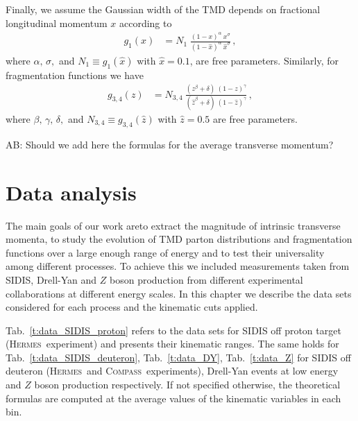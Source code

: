 \documentclass[aps,preprintnumbers,showpacs,nofootinbib,superscriptaddress,floatfix]{revtex4}
\newcommand{\AS}[1]{{\textcolor[rgb]{1,0,1}{#1}}}
\newcommand{\hermes}{\textsc{Hermes}}
\newcommand{\compass}{\textsc{Compass}}
\begin{document}
Finally, we assume the Gaussian width of the TMD depends on 
fractional longitudinal momentum $x$ according to
\begin{align} 
 g_1 (x) &= N_1 \;  
\frac{(1-x)^{\alpha} \  x^{\sigma} }{ (1 - \hat{x})^{\alpha} \  \hat{x}^{\sigma} } \, ,
\label{e:kT2_kin}
\end{align}
where $\alpha, \, \sigma,$ and $N_1 \equiv  g_1 (\hat{x})$ with $\hat{x} = 0.1$,
are free parameters. Similarly, for fragmentation functions we have
\begin{align}  
g_{3,4} (z) &= N_{3,4} \  
               \frac{ (z^{\beta} + \delta)\ (1-z)^{\gamma} }{ (\hat{z}^{\beta} + \delta)\   (1 - \hat{z})^{\gamma} } \, ,
 \label{e:PT2_kin}
 \end{align}
where $\beta, \, \gamma, \, \delta, $ and $N_{3,4} \equiv g_{3,4} (\hat{z})$ with
$\hat{z} = 0.5$ 
are free parameters. 

\AS{AB: Should we add here the formulas for the average transverse momentum?} 

\section{Data analysis}
\label{s:data_analysis}


The main goals of our work areto extract the magnitude of intrinsic transverse momenta, to study the evolution of TMD parton distributions and fragmentation functions over a large enough range of energy and to test their universality among different processes.
To achieve this we included measurements taken from SIDIS, Drell-Yan and $Z$ boson production from different experimental collaborations at different energy scales.
In this chapter we describe the data sets considered for each process and the kinematic cuts applied.

Tab.~\ref{t:data_SIDIS_proton} refers to the data sets for SIDIS off proton target (\hermes\ experiment) and presents their kinematic ranges. 
The same holds for Tab.~\ref{t:data_SIDIS_deuteron}, Tab.~\ref{t:data_DY}, Tab.~\ref{t:data_Z} for SIDIS off deuteron (\hermes\ and \compass\ experiments), Drell-Yan events at low energy and $Z$ boson production respectively. 
If not specified otherwise, the theoretical formulas are computed at the
average values of the kinematic variables in each bin.
\end{document}
